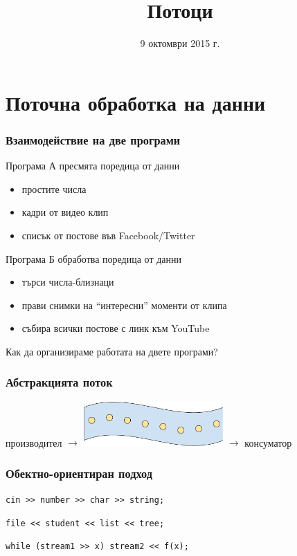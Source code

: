 \documentclass{beamer}
\title{Потоци}
\date{9 октомври 2015 г.}
\begin{document}
\begin{frame}
  \titlepage
\end{frame}

\section{Поточна обработка на данни}

\begin{frame}
  \frametitle{Взаимодействие на две програми}

  Програма А пресмята поредица от данни
  \begin{itemize}
  \item простите числа
  \item кадри от видео клип
  \item списък от постове във Facebook/Twitter
  \end{itemize}
  \vspace{1em}
  
  Програма Б обработва поредица от данни
  \begin{itemize}
  \item търси числа-близнаци
  \item прави снимки на ``интересни'' моменти от
    клипа
  \item събира всички постове с линк към YouTube
  \end{itemize}
  \vspace{2em}
  
  \alert{Как да организираме работата на двете програми?}
\end{frame}

\begin{frame}
  \frametitle{Абстракцията поток}

  \begin{center}
    производител
    $\longrightarrow$ \includegraphics[width=0.4\textwidth,valign=c]{images/abstract_stream.pdf}
    $\longrightarrow$ консуматор
  \end{center}
\end{frame}

\begin{frame}
  \frametitle{Обектно-ориентиран подход}

  \tt{cin >{}> number >{}> char >{}> string;}
  \vspace{2em}

  \tt{file <{}< student <{}< list <{}< tree;}
  \vspace{2em}
  
  \tt{while (stream1 >{}> x) stream2 <{}< f(x);}
\end{frame}
\end{document}
